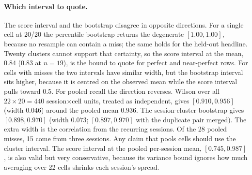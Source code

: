 \paragraph{Which interval to quote.}
The score interval and the bootstrap disagree in opposite directions. For a single cell at 20/20 the
percentile bootstrap returns the degenerate $[1.00,1.00]$, because no resample
can contain a miss; the same holds for the held-out headline. Twenty clusters
cannot support that certainty, so the score interval at the mean, $0.84$
($0.83$ at $n{=}19$), is the bound to quote for perfect and near-perfect rows.
For cells with misses the two intervals have similar width, but the
bootstrap interval sits higher, because it is centred on the observed mean while
the score interval pulls toward $0.5$. For pooled recall the direction reverses. Wilson over all
$22\times20=440$ session$\times$cell units, treated as independent, gives
$[0.910, 0.956]$ (width $0.046$) around the pooled mean $0.936$. The
session-cluster bootstrap gives $[0.898, 0.970]$ (width $0.073$; $[0.897, 0.970]$
with the duplicate pair merged). The extra width is the correlation from the
recurring sessions. Of the 28 pooled misses, 15 come from three sessions. Any claim that
pools cells should use the cluster interval. The score interval at the pooled
per-session mean, $[0.745, 0.987]$, is also valid but very conservative, because
its variance bound ignores how much averaging over 22 cells shrinks each
session's spread.


